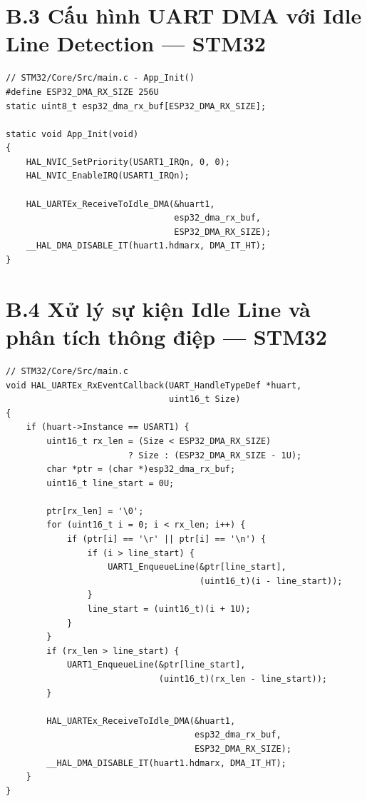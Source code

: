 \section*{B.3 \quad Cấu hình UART DMA với Idle Line Detection --- STM32}

\begin{lstlisting}[style=cstyle,
  caption={Khởi tạo UART1 DMA theo chế độ Receive-to-Idle (STM32F411CEU6)},
  label={lst:uart_dma_init}]
// STM32/Core/Src/main.c - App_Init()
#define ESP32_DMA_RX_SIZE 256U
static uint8_t esp32_dma_rx_buf[ESP32_DMA_RX_SIZE];

static void App_Init(void)
{
    HAL_NVIC_SetPriority(USART1_IRQn, 0, 0);
    HAL_NVIC_EnableIRQ(USART1_IRQn);

    HAL_UARTEx_ReceiveToIdle_DMA(&huart1,
                                 esp32_dma_rx_buf,
                                 ESP32_DMA_RX_SIZE);
    __HAL_DMA_DISABLE_IT(huart1.hdmarx, DMA_IT_HT);
}
\end{lstlisting}

\section*{B.4 \quad Xử lý sự kiện Idle Line và phân tích thông điệp --- STM32}

\begin{lstlisting}[style=cstyle,
  caption={Callback ngắt Idle Line - xử lý thông điệp hoàn chỉnh},
  label={lst:uart_idle_callback}]
// STM32/Core/Src/main.c
void HAL_UARTEx_RxEventCallback(UART_HandleTypeDef *huart, 
                                uint16_t Size)
{
    if (huart->Instance == USART1) {
        uint16_t rx_len = (Size < ESP32_DMA_RX_SIZE)
                        ? Size : (ESP32_DMA_RX_SIZE - 1U);
        char *ptr = (char *)esp32_dma_rx_buf;
        uint16_t line_start = 0U;

        ptr[rx_len] = '\0';
        for (uint16_t i = 0; i < rx_len; i++) {
            if (ptr[i] == '\r' || ptr[i] == '\n') {
                if (i > line_start) {
                    UART1_EnqueueLine(&ptr[line_start],
                                      (uint16_t)(i - line_start));
                }
                line_start = (uint16_t)(i + 1U);
            }
        }
        if (rx_len > line_start) {
            UART1_EnqueueLine(&ptr[line_start],
                              (uint16_t)(rx_len - line_start));
        }

        HAL_UARTEx_ReceiveToIdle_DMA(&huart1,
                                     esp32_dma_rx_buf,
                                     ESP32_DMA_RX_SIZE);
        __HAL_DMA_DISABLE_IT(huart1.hdmarx, DMA_IT_HT);
    }
}
\end{lstlisting}

